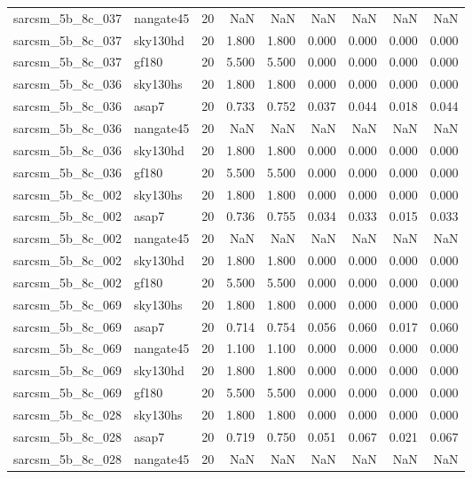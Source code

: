 \begin{tabular}{llrrrrrrr}
sarcsm\_5b\_8c\_037 & nangate45 & 20 & NaN & NaN & NaN & NaN & NaN & NaN \\
sarcsm\_5b\_8c\_037 & sky130hd & 20 & 1.800 & 1.800 & 0.000 & 0.000 & 0.000 & 0.000 \\
sarcsm\_5b\_8c\_037 & gf180 & 20 & 5.500 & 5.500 & 0.000 & 0.000 & 0.000 & 0.000 \\
sarcsm\_5b\_8c\_036 & sky130hs & 20 & 1.800 & 1.800 & 0.000 & 0.000 & 0.000 & 0.000 \\
sarcsm\_5b\_8c\_036 & asap7 & 20 & 0.733 & 0.752 & 0.037 & 0.044 & 0.018 & 0.044 \\
sarcsm\_5b\_8c\_036 & nangate45 & 20 & NaN & NaN & NaN & NaN & NaN & NaN \\
sarcsm\_5b\_8c\_036 & sky130hd & 20 & 1.800 & 1.800 & 0.000 & 0.000 & 0.000 & 0.000 \\
sarcsm\_5b\_8c\_036 & gf180 & 20 & 5.500 & 5.500 & 0.000 & 0.000 & 0.000 & 0.000 \\
sarcsm\_5b\_8c\_002 & sky130hs & 20 & 1.800 & 1.800 & 0.000 & 0.000 & 0.000 & 0.000 \\
sarcsm\_5b\_8c\_002 & asap7 & 20 & 0.736 & 0.755 & 0.034 & 0.033 & 0.015 & 0.033 \\
sarcsm\_5b\_8c\_002 & nangate45 & 20 & NaN & NaN & NaN & NaN & NaN & NaN \\
sarcsm\_5b\_8c\_002 & sky130hd & 20 & 1.800 & 1.800 & 0.000 & 0.000 & 0.000 & 0.000 \\
sarcsm\_5b\_8c\_002 & gf180 & 20 & 5.500 & 5.500 & 0.000 & 0.000 & 0.000 & 0.000 \\
sarcsm\_5b\_8c\_069 & sky130hs & 20 & 1.800 & 1.800 & 0.000 & 0.000 & 0.000 & 0.000 \\
sarcsm\_5b\_8c\_069 & asap7 & 20 & 0.714 & 0.754 & 0.056 & 0.060 & 0.017 & 0.060 \\
sarcsm\_5b\_8c\_069 & nangate45 & 20 & 1.100 & 1.100 & 0.000 & 0.000 & 0.000 & 0.000 \\
sarcsm\_5b\_8c\_069 & sky130hd & 20 & 1.800 & 1.800 & 0.000 & 0.000 & 0.000 & 0.000 \\
sarcsm\_5b\_8c\_069 & gf180 & 20 & 5.500 & 5.500 & 0.000 & 0.000 & 0.000 & 0.000 \\
sarcsm\_5b\_8c\_028 & sky130hs & 20 & 1.800 & 1.800 & 0.000 & 0.000 & 0.000 & 0.000 \\
sarcsm\_5b\_8c\_028 & asap7 & 20 & 0.719 & 0.750 & 0.051 & 0.067 & 0.021 & 0.067 \\
sarcsm\_5b\_8c\_028 & nangate45 & 20 & NaN & NaN & NaN & NaN & NaN & NaN \\

\end{tabular}

